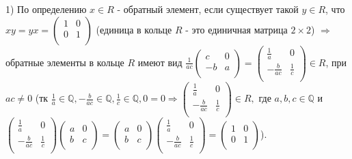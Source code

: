 \documentclass[a4paper, 16pt]{article}
\newcommand{\Q} {\mathbb{Q}}
\newenvironment{solution}[1][Решение]{%
	\begin{trivlist}
		\item[\hskip \labelsep {\bfseries #1:}]
		\item \hspace{15pt}
	}{
	\end{trivlist}
}
\begin{document}
		\begin{solution}
			1) По определению $x \in R$ - обратный элемент, если существует такой $y \in R$, что $xy = yx =\begin{pmatrix}
				1 & 0 \\
				0 & 1 \\
			\end{pmatrix}$ (единица в кольце $R$ - это единичная матрица $2 \times 2$) $ \Rightarrow$ обратные элементы в кольце $R$ имеют вид $\frac{1}{ac} \begin{pmatrix}
			c & 0 \\
			-b & a \\
		\end{pmatrix} =  \begin{pmatrix}
		\frac{1}{a} & 0 \\
		-\frac{b}{ac} & \frac{1}{c} \\
		\end{pmatrix} \in R$, при $ac\ne0$ (тк $\frac{1}{a} \in \Q, -\frac{b}{ac} \in \Q, \frac{1}{c} \in \Q, 0 = 0 \Rightarrow \begin{pmatrix}
		\frac{1}{a} & 0 \\
		-\frac{b}{ac} & \frac{1}{c} \\
		\end{pmatrix} \in R,$ где $a, b, c \in \Q$ и $\begin{pmatrix}
		\frac{1}{a} & 0 \\
		-\frac{b}{ac} & \frac{1}{c} \\
			\end{pmatrix} \begin{pmatrix}
			a & 0 \\
			b & c \\
		\end{pmatrix}  = \begin{pmatrix}
		a & 0 \\
		b & c \\
		\end{pmatrix} \begin{pmatrix}
		\frac{1}{a} & 0 \\
		-\frac{b}{ac} & \frac{1}{c} \\
		\end{pmatrix} = \begin{pmatrix}
		1 & 0 \\
		0 & 1 \\
		\end{pmatrix} $).
	
	
			\	
	

\end{solution}
\end{document}
